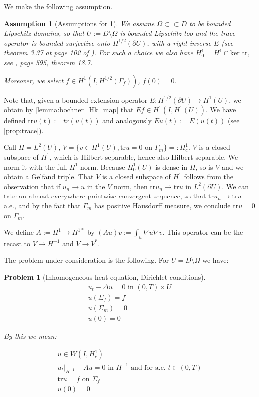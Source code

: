 \documentclass[english,a4paper,10pt,oneside]{scrbook}	%
\theoremstyle{break}
\newtheorem{ass}[equation]{Assumption}
\newtheorem{pb}[equation]{Problem}
\theoremstyle{remark}
\newcommand{\tr}{\text{tr}}
\newcommand{\cc}{\subset\subset}
\begin{document}
We make the following assumption.

\begin{ass}[Assumptions for \cref{pb:diri}]
\label{ass:diri}
We assume $\Omega \cc D $ to be bounded Lipschitz domains, so that $U:=D\setminus \Omega$ is bounded Lipschitz too and  the trace operator is bounded surjective onto $H^{1/2}(\partial U)$, with a right inverse $E$ (see theorem 3.37 at page 102 of \cite{mclean}). For such a choice we also have $H^1_0=H^1\cap \text{ker }\tr$, see \cite{leoni}, page 595, theorem 18.7.

Moreover, we select $f \in H^1(I, H^{1/2}(\Gamma_f))$, $f(0)=0$.
\end{ass}

Note that, given a bounded extension operator $E: H^{1/2}(\partial U) \rightarrow H^1(U)$, we obtain by \cref{lemma:bochner_Hk_map} that $Ef \in H^1(I, H^1(U))$. We have defined $\tr u (t):= tr(u(t))$ and analogously $Eu(t):=E(u(t))$ (see \cref{prop:trace}).

Call $H=L^2(U)$, $V=\{ v \in H^1(U), \tr u = 0 \text{ on } \Gamma_m\}=:H^1_c$. $V$ is a closed subspace of $H^1$, which is Hilbert separable, hence also Hilbert separable. We norm it with the full $H^1$ norm. Because $H^1_0(U)$ is dense in $H$, so is $V$ and we obtain a Gelfand triple. That $V$ is a closed subspace of $H^1$ follows from the observation that if $u_n\rightarrow u$ in the $V$ norm, then $\tr u_n \rightarrow \tr u$ in $L^2(\partial U)$. We can take an almost everywhere pointwise convergent sequence, so that $\tr u_n \rightarrow \tr u$ a.e., and by the fact that $\Gamma_m$ has positive Hausdorff measure, we conclude $\tr u = 0$ on $\Gamma_m$.

We define $A:= H^1 \rightarrow H^{1*}$ by $(Au)v:=\int_u\nabla u \nabla v$. This operator can be the recast to $V\rightarrow H^{-1}$ and $V\rightarrow V^*$.

The problem under consideration is the following. For $U = D\setminus \Omega$ we have:

\begin{pb}[Inhomogeneous heat equation, Dirichlet conditions]
\label{pb:diri}
\begin{align}
u_t - \Delta u = 0 \text{ in } (0,T)\times U\\
u(\Sigma_f)=f\\
u(\Sigma_m)=0\\
u(0)=0
\end{align}

By this we mean:

\begin{align}
u \in W(I,H^1_c) \\
u_t|_{H^{-1}} + A u = 0 \text{ in }H^{-1} \text{ and for a.e. } t \in (0,T) \\
\tr u = f \text{ on } \Sigma_f\\
u(0)=0
\end{align}

\end{pb}
\end{document}
